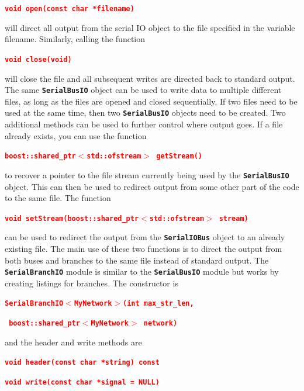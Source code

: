 \documentclass[12pt]{report} %
\begin{document}
\textcolor{red}{\texttt{\textbf{void open(const char *filename)}}}

will direct all output from the serial IO object to the file specified in the variable filename. Similarly, calling the function

\textcolor{red}{\texttt{\textbf{void close(void)}}}

will close the file and all subsequent writes are directed back to standard output. The same \texttt{\textbf{SerialBusIO}} object can be used to write data to multiple different files, as long as the files are opened and closed sequentially. If two files need to be used at the same time, then two \texttt{\textbf{SerialBusIO}} objects need to be created. Two additional methods can be used to further control where output goes. If a file already exists, you can use the function

\textcolor{red}{\texttt{\textbf{boost::shared\_ptr$\boldsymbol{\mathrm{<}}$std::ofstream$\boldsymbol{\mathrm{>}}$ getStream()}}}

to recover a pointer to the file stream currently being used by the \texttt{\textbf{SerialBusIO}} object. This can then be used to redirect output from some other part of the code to the same file. The function

\textcolor{red}{\texttt{\textbf{void setStream(boost::shared\_ptr$\boldsymbol{\mathrm{<}}$std::ofstream$\boldsymbol{\mathrm{>}}$ stream)}}}

can be used to redirect the output from the \texttt{\textbf{SerialIOBus}} object to an already existing file. The main use of these two functions is to direct the output from both buses and branches to the same file instead of standard output.
The \texttt{\textbf{SerialBranchIO}} module is similar to the \texttt{\textbf{SerialBusIO}} module but works by creating listings for branches. The constructor is

\textcolor{red}{\texttt{\textbf{SerialBranchIO$\boldsymbol{\mathrm{<}}$MyNetwork$\boldsymbol{\mathrm{>}}$(int max\_str\_len,}}}

\textcolor{red}{\texttt{\textbf{   boost::shared\_ptr$\boldsymbol{\mathrm{<}}$MyNetwork$\boldsymbol{\mathrm{>}}$ network)}}}

and the header and write methods are

\textcolor{red}{\texttt{\textbf{void header(const char *string) const}}}


\textcolor{red}{\texttt{\textbf{void write(const char *signal = NULL)}}}
\end{document}

